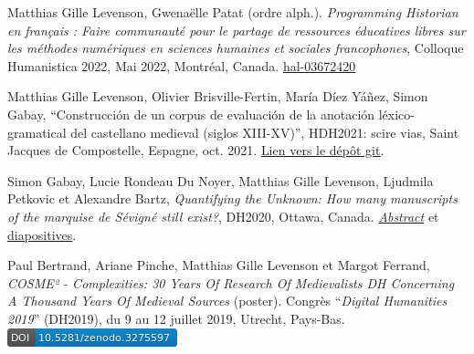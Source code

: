 \begin{rubric}{}
                    \entry*
                Matthias Gille Levenson, Gwenaëlle Patat (ordre alph.). \textit{Programming
                            Historian en français : Faire communauté pour le partage de ressources
                            éducatives libres sur les méthodes numériques en sciences humaines et
                            sociales francophones}, Colloque Humanistica 2022, Mai 2022, Montréal,
                        Canada. \href{https://hal.archives-ouvertes.fr/hal-03672420}{hal-03672420}
                    
                    \entry*
                Matthias Gille Levenson, Olivier Brisville-Fertin, María Díez Yáñez, Simon
                        Gabay, \enquote{Construcción de un corpus de evaluación de la anotación
                                léxico-gramatical del castellano medieval (siglos XIII-XV)},
                        HDH2021: scire vias, Saint Jacques de Compostelle, Espagne, oct. 2021. \href{https://gitlab.huma-num.fr/mgillelevenson/paper_hdh_lematizacion}{Lien
                            vers le dépôt git}.
                    
                    \entry*
                Simon Gabay, Lucie Rondeau Du Noyer, Matthias Gille Levenson, Ljudmila
                        Petkovic et Alexandre Bartz, \textit{\textit{Quantifying the Unknown: How many
                                manuscripts of the marquise de Sévigné still exist?}}, DH2020,
                        Ottawa, Canada. \href{https://hal.archives-ouvertes.fr/hal-02898929/document}{\textit{Abstract}} et \href{http://dx.doi.org/10.17613/2pwa-0f46}{diapositives}.
                    
                    \entry*
                Paul Bertrand, Ariane Pinche, Matthias Gille Levenson et Margot Ferrand,
                            \textit{COSME² - Complexities: 30 Years Of Research Of
                                Medievalists DH Concerning A Thousand Years Of Medieval
                            Sources} (poster). Congrès \enquote{\textit{Digital Humanities
                            2019}} (DH2019), du 9 au 12 juillet 2019, Utrecht, Pays-Bas. \href{https://zenodo.org/record/3275597}{\includegraphics[scale=0.55]{img/zenodo3275597.png}}
                    
                \vspace{1cm}
            

\end{rubric}
